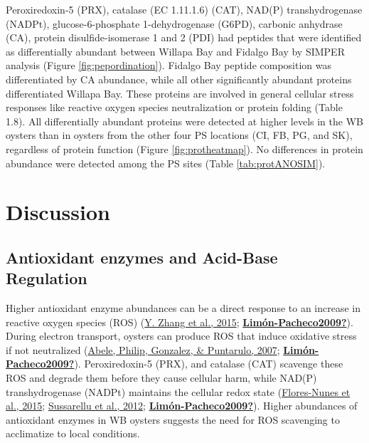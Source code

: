 \documentclass [11pt, proquest] {uwthesis}[2015/03/03]
\begin{document}
Peroxiredoxin-5 (PRX), catalase (EC 1.11.1.6) (CAT), NAD(P) transhydrogenase (NADPt), glucose-6-phosphate 1-dehydrogenase (G6PD), carbonic anhydrase (CA), protein disulfide-isomerase 1 and 2 (PDI) had peptides that were identified as differentially abundant between Willapa Bay and Fidalgo Bay by SIMPER analysis (Figure \ref{fig:pepordination}). Fidalgo Bay peptide composition was differentiated by CA abundance, while all other significantly abundant proteins differentiated Willapa Bay. These proteins are involved in general cellular stress responses like reactive oxygen species neutralization or protein folding (Table 1.8). All differentially abundant proteins were detected at higher levels in the WB oysters than in oysters from the other four PS locations (CI, FB, PG, and SK), regardless of protein function (Figure \ref{fig:protheatmap}). No differences in protein abundance were detected among the PS sites (Table \ref{tab:protANOSIM}).

\hypertarget{discussion}{%
\section{Discussion}\label{discussion}}

\hypertarget{antioxidant-enzymes-and-acid-base-regulation}{%
\subsection{Antioxidant enzymes and Acid-Base Regulation}\label{antioxidant-enzymes-and-acid-base-regulation}}

Higher antioxidant enzyme abundances can be a direct response to an increase in reactive oxygen species (ROS) (\protect\hyperlink{ref-Zhang2015}{Y. Zhang et al., 2015}; \protect\hyperlink{ref-Limuxf3n-Pacheco2009}{\textbf{Limón-Pacheco2009?}}). During electron transport, oysters can produce ROS that induce oxidative stress if not neutralized (\protect\hyperlink{ref-Abele2007}{Abele, Philip, Gonzalez, \& Puntarulo, 2007}; \protect\hyperlink{ref-Limuxf3n-Pacheco2009}{\textbf{Limón-Pacheco2009?}}). Peroxiredoxin-5 (PRX), and catalase (CAT) scavenge these ROS and degrade them before they cause cellular harm, while NAD(P) transhydrogenase (NADPt) maintains the cellular redox state (\protect\hyperlink{ref-Flores-Nunes2015}{Flores-Nunes et al., 2015}; \protect\hyperlink{ref-Sussarellu2012}{Sussarellu et al., 2012}; \protect\hyperlink{ref-Limuxf3n-Pacheco2009}{\textbf{Limón-Pacheco2009?}}). Higher abundances of antioxidant enzymes in WB oysters suggests the need for ROS scavenging to acclimatize to local conditions.
\end{document}
